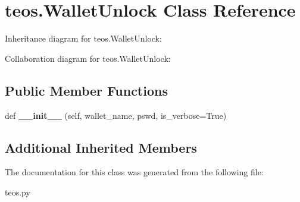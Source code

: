 \hypertarget{classteos_1_1WalletUnlock}{}\section{teos.\+Wallet\+Unlock Class Reference}
\label{classteos_1_1WalletUnlock}


Inheritance diagram for teos.\+Wallet\+Unlock\+:


Collaboration diagram for teos.\+Wallet\+Unlock\+:
\subsection*{Public Member Functions}
\begin{DoxyCompactItemize}
\item 
\mbox{\label{classteos_1_1WalletUnlock_a0365bf89374cd0b455082e27791df0a7}} 
def {\bfseries \+\_\+\+\_\+init\+\_\+\+\_\+} (self, wallet\+\_\+name, pswd, is\+\_\+verbose=True)
\end{DoxyCompactItemize}
\subsection*{Additional Inherited Members}


The documentation for this class was generated from the following file\+:\begin{DoxyCompactItemize}
\item 
teos.\+py\end{DoxyCompactItemize}

